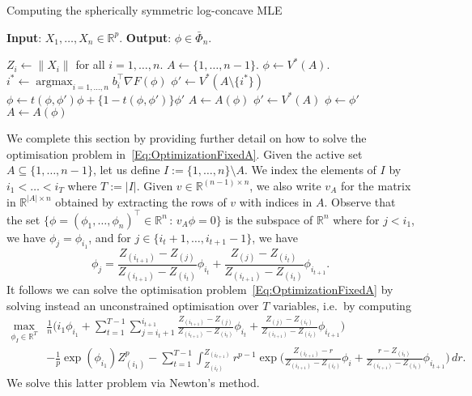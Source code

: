 \documentclass[a4paper,12pt]{article}
\DeclareMathOperator*{\argmax}{argmax}
\begin{document}
\begin{algorithm}
\caption{Computing the spherically symmetric log-concave MLE}
\label{Alg:ActiveSet}
\textbf{Input}: $X_1,\ldots, X_n \in \mathbb{R}^p$. 
\textbf{Output}: $\phi \in \bar{\Phi}_n$.

\begin{algorithmic}[1]
\State $Z_i \leftarrow \| X_i\|$ for all $i=1,\ldots,n$.
\State $A \leftarrow \{1,\ldots,n-1\}$.
\State $\phi \leftarrow V^*(A)$.
 \State $i^* \leftarrow \argmax_{i=1,\ldots,n} b_i^\top \nabla F(\phi) $
\State $\phi' \leftarrow V^*(A \setminus \{i^*\})$
    \State $\phi \leftarrow t(\phi, \phi') \phi + \{1 - t(\phi, \phi')\} \phi'$ 
    \State $A \leftarrow A(\phi)$
    \State $\phi' \leftarrow V^*(A)$
 \EndWhile
 \State $\phi \leftarrow \phi'$
 \State $A \leftarrow A(\phi)$
\EndWhile   
\end{algorithmic}
\end{algorithm}


We complete this section by providing further detail on how to solve the optimisation problem in~\eqref{Eq:OptimizationFixedA}. Given the active set $A \subseteq \{1,\ldots,n-1\}$, let us define $I := \{1,\ldots,n\} \setminus A$. We index the elements of $I$ by $i_1 < \ldots < i_T$ where $T := |I|$.  Given $v \in \mathbb{R}^{(n-1) \times n}$, we also write $v_A$ for the matrix in $\mathbb{R}^{|A| \times n}$ obtained by extracting the rows of $v$ with indices in $A$.  Observe that the set $\{ \phi = (\phi_1,\ldots,\phi_n)^\top \in \mathbb{R}^n \,:\, v_A \phi = 0 \}$ is the subspace of $\mathbb{R}^n$ where for $j < i_1$, we have $\phi_j = \phi_{i_1}$, and for $j \in \{i_t+1,\ldots,i_{t+1}-1\}$, we have 
\[
\phi_j = \frac{Z_{(i_{t+1})} - Z_{(j)}}{Z_{(i_{t+1})} - Z_{(i_t)}} \phi_{i_t} +
         \frac{Z_{(j)} - Z_{(i_t)}}{Z_{(i_{t+1})} - Z_{(i_t)}} \phi_{i_{t+1}}.
\]
It follows  we can solve the optimisation problem~\eqref{Eq:OptimizationFixedA} by solving instead an unconstrained optimisation over $T$ variables, i.e.~by computing
\begin{align*}
\max_{\phi_I \in \mathbb{R}^T} & \frac{1}{n} \biggl( i_1 \phi_{i_1} + 
          \sum_{t=1}^{T-1} \sum_{j=i_t + 1}^{i_{t+1}}   
         \frac{Z_{(i_{t+1})} - Z_{(j)}}{Z_{(i_{t+1})} - Z_{(i_t)}} \phi_{i_t} +
         \frac{Z_{(j)} - Z_{(i_t)}}{Z_{(i_{t+1})} - Z_{(i_t)}} \phi_{i_{t+1}} \biggr) \\
     &  - \frac{1}{p}\exp(\phi_{i_1}) Z_{(i_1)}^p - 
       \sum_{t=1}^{T-1} \int_{Z_{(i_t)}}^{Z_{(i_{t+1})}} r^{p-1} \exp
       \biggl( \frac{Z_{(i_{t+1})} -r}{Z_{(i_{t+1})} -Z_{(i_t)}} \phi_i + \frac{r -Z_{(i_t)}}{Z_{(i_{t+1})} -Z_{(i_t)}} \phi_{i_{t+1}}\biggr) \, dr.
\end{align*}
We solve this latter problem via Newton's method. 
\end{document}
